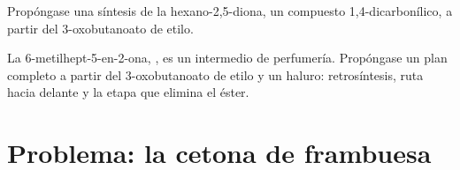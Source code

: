\begin{exercise}[$\star\star\star$]\label{exo:b2:retrosynthesis:11}
Propóngase una síntesis de la hexano-2,5-diona, un compuesto 1,4-dicarbonílico, a partir del 3-oxobutanoato de etilo.
\end{exercise}

\begin{exercise}[$\star\star\star$]\label{exo:b2:retrosynthesis:12}
La 6-metilhept-5-en-2-ona, , es un intermedio de perfumería. Propóngase un plan completo
a partir del 3-oxobutanoato de etilo y un haluro: retrosíntesis, ruta hacia delante y la etapa que elimina el
éster.
\end{exercise}

\section{Problema: la cetona de frambuesa}

